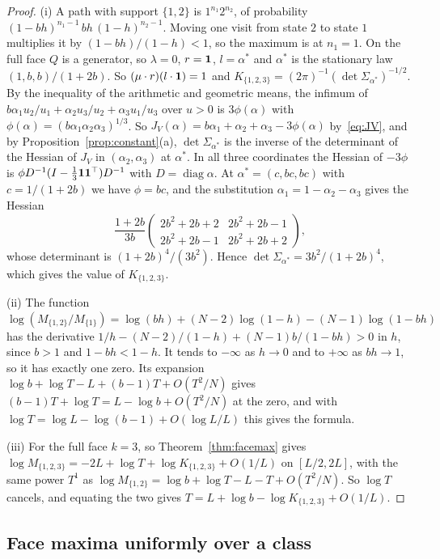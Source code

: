 \begin{proof}[Proof]
(i) A path with support $\{1,2\}$ is $1^{n_1}2^{n_2}$, of probability
$(1-bh)^{n_1-1}\,bh\,(1-h)^{n_2-1}$. Moving one visit from state $2$ to state $1$
multiplies it by $(1-bh)/(1-h)<1$, so the maximum is at $n_1=1$. On the full face $Q$
is a generator, so $\lambda=0$, $r=\mathbf{1}$, $l=\alpha^*$ and $\alpha^*$ is the stationary law
$(1,b,b)/(1+2b)$. So $(\mu\cdot r)(l\cdot\mathbf{1})=1$ and
$K_{\{1,2,3\}}=(2\pi)^{-1}(\det\Sigma_{\alpha^*})^{-1/2}$. By the inequality of the
arithmetic and geometric means, the infimum of
$b\alpha_1u_2/u_1+\alpha_2u_3/u_2+\alpha_3u_1/u_3$ over $u>0$ is $3\phi(\alpha)$ with
$\phi(\alpha)=(b\alpha_1\alpha_2\alpha_3)^{1/3}$. So
$J_V(\alpha)=b\alpha_1+\alpha_2+\alpha_3-3\phi(\alpha)$ by~\eqref{eq:JV}, and by
Proposition~\ref{prop:constant}(a), $\det\Sigma_{\alpha^*}$ is the inverse of the determinant
of the Hessian of $J_V$ in $(\alpha_2,\alpha_3)$ at $\alpha^*$. In all three coordinates the
Hessian of $-3\phi$ is $\phi D^{-1}(I-\frac13\mathbf{1}\mathbf{1}^\top)D^{-1}$ with
$D=\operatorname{diag}\alpha$. At $\alpha^*=(c,bc,bc)$ with $c=1/(1+2b)$ we have $\phi=bc$, and
the substitution $\alpha_1=1-\alpha_2-\alpha_3$ gives the Hessian
\[
\frac{1+2b}{3b}\begin{pmatrix}2b^2+2b+2&2b^2+2b-1\\2b^2+2b-1&2b^2+2b+2\end{pmatrix},
\]
whose determinant is $(1+2b)^4/(3b^2)$. Hence $\det\Sigma_{\alpha^*}=3b^2/(1+2b)^4$, which
gives the value of $K_{\{1,2,3\}}$.

(ii) The function $\log(M_{\{1,2\}}/M_{\{1\}})=\log(bh)+(N-2)\log(1-h)-(N-1)\log(1-bh)$
has the derivative $1/h-(N-2)/(1-h)+(N-1)b/(1-bh)>0$ in $h$, since $b>1$ and
$1-bh<1-h$. It tends to $-\infty$ as $h\to0$ and to $+\infty$ as $bh\to1$, so it has
exactly one zero. Its expansion $\log b+\log T-L+(b-1)T+O(T^2/N)$ gives
$(b-1)T+\log T=L-\log b+O(T^2/N)$ at the zero, and with $\log T=\log L-\log(b-1)+O(\log L/L)$
this gives the formula.

(iii) For the full face $k=3$, so Theorem~\ref{thm:facemax} gives
$\log M_{\{1,2,3\}}=-2L+\log T+\log K_{\{1,2,3\}}+O(1/L)$ on $[L/2,2L]$, with the same
power $T^1$ as $\log M_{\{1,2\}}=\log b+\log T-L-T+O(T^2/N)$. So $\log T$ cancels, and
equating the two gives $T=L+\log b-\log K_{\{1,2,3\}}+O(1/L)$.
\end{proof}


\subsection{Face maxima uniformly over a class}\label{sec:uniform-class}

